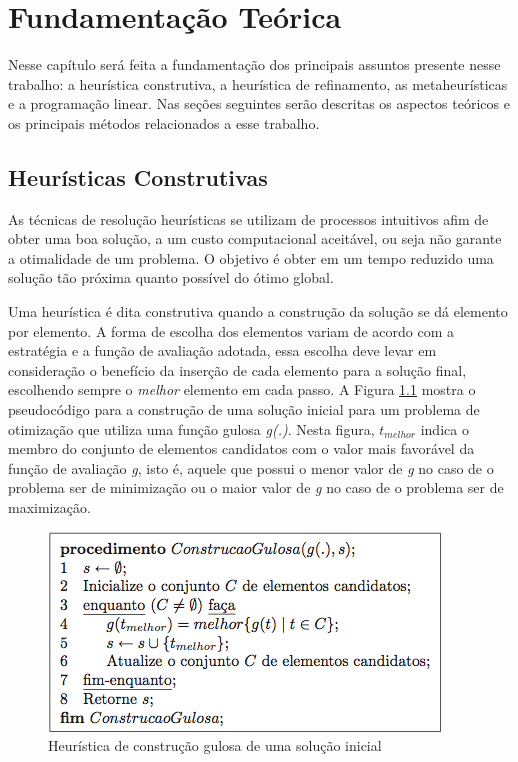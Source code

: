 \chapter{Fundamentação Teórica}

  Nesse capítulo será feita a fundamentação dos principais assuntos presente nesse trabalho: a heurística construtiva, a heurística de refinamento, as metaheurísticas e a programação linear. Nas seções seguintes serão descritas os aspectos teóricos e os principais métodos relacionados a esse trabalho.

	\section{Heurísticas Construtivas}
		As técnicas de resolução heurísticas se utilizam de processos intuitivos afim de obter uma boa solução, a um custo computacional aceitável, ou seja não garante a otimalidade de um problema. O objetivo é obter em um tempo reduzido uma solução tão próxima quanto possível do ótimo global. 
		
		Uma heurística é dita construtiva quando a construção da solução se dá elemento por elemento. A forma de escolha dos elementos variam de acordo com a estratégia e a função de avaliação adotada, essa escolha deve levar em consideração o benefício da inserção de cada elemento para a solução final, escolhendo sempre o \emph{melhor} elemento em cada passo.
		A Figura \ref{heuristicaconstrutiva} mostra o pseudocódigo para a construção de uma solução inicial para um problema de otimização que utiliza uma função gulosa \emph{g(.)}. Nesta figura, \emph{$t_{melhor}$} indica o membro do conjunto de elementos candidatos com o valor mais favorável da função de avaliação \emph{g}, isto é, aquele que possui o menor valor de \emph{g} no caso de o problema ser de minimização ou o maior valor de \emph{g} no caso de o problema ser de maximização.
		
\begin{figure}[ht]
	\centering
	\includegraphics[scale=0.7]{./img/heuristicaconstrutiva}
	\caption{Heurística de construção gulosa de uma solução inicial}
	\label{heuristicaconstrutiva}
\end{figure}

